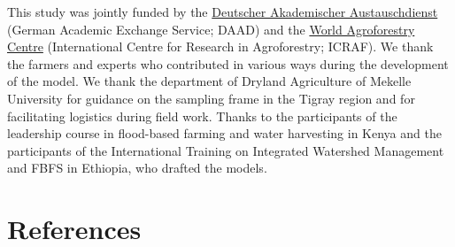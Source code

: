 \documentclass[]{elsarticle} %
\begin{document}
This study was jointly funded by the \href{https://www.daad.de/en/}{Deutscher Akademischer Austauschdienst} (German Academic Exchange Service; DAAD) and the \href{http://www.worldagroforestry.org/}{World Agroforestry Centre} (International Centre for Research in Agroforestry; ICRAF). We thank the farmers and experts who contributed in various ways during the development of the model. We thank the department of Dryland Agriculture of Mekelle University for guidance on the sampling frame in the Tigray region and for facilitating logistics during field work. Thanks to the participants of the leadership course in flood-based farming and water harvesting in Kenya and the participants of the International Training on Integrated Watershed Management and FBFS in Ethiopia, who drafted the models.

\hypertarget{references}{%
\section*{References}\label{references}}
\end{document}

